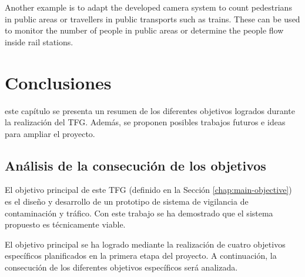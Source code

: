 Another example is to adapt the developed camera system to count pedestrians in public areas or travellers in public transports such as trains. These can be used to monitor the number of people in public areas or determine the people flow inside rail stations.





\chapter{Conclusiones}
\label{chap:conclusiones}

 este capítulo se presenta un resumen de los diferentes objetivos logrados durante la realización del \ac{TFG}. Además, se proponen posibles trabajos futuros e ideas para ampliar el proyecto.

\section{Análisis de la consecución de los objetivos}
El objetivo principal de este \ac{TFG} (definido en la Sección \ref{chap:main-objective}) es el diseño y desarrollo de un prototipo de sistema de vigilancia de contaminación y tráfico. Con este trabajo se ha demostrado que el sistema propuesto es técnicamente viable.

El objetivo principal se ha logrado mediante la realización de cuatro objetivos específicos planificados en la primera etapa del proyecto. A continuación, la consecución de los diferentes objetivos específicos será analizada.


